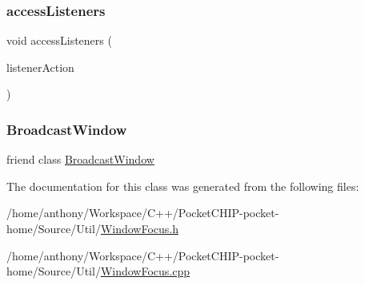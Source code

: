 \subsubsection{\texorpdfstring{access\+Listeners}{accessListeners}}
{\footnotesize\ttfamily void access\+Listeners (\begin{DoxyParamCaption}\item[{std\+::function$<$ void(Array$<$ \mbox{\hyperlink{classWindowFocus_1_1Listener}{Window\+Focus\+::\+Listener}} $\ast$$>$ \&) $>$}]{listener\+Action }\end{DoxyParamCaption})\hspace{0.3cm}{\ttfamily [friend]}}

\mbox{\label{classWindowFocus_1_1Listener_a279028e0d9a84a0657de4a70a6232340}} 
\subsubsection{\texorpdfstring{Broadcast\+Window}{BroadcastWindow}}
{\footnotesize\ttfamily friend class \mbox{\hyperlink{classWindowFocus_1_1BroadcastWindow}{Broadcast\+Window}}\hspace{0.3cm}{\ttfamily [friend]}}



The documentation for this class was generated from the following files\+:\begin{DoxyCompactItemize}
\item 
/home/anthony/\+Workspace/\+C++/\+Pocket\+C\+H\+I\+P-\/pocket-\/home/\+Source/\+Util/\mbox{\hyperlink{WindowFocus_8h}{Window\+Focus.\+h}}\item 
/home/anthony/\+Workspace/\+C++/\+Pocket\+C\+H\+I\+P-\/pocket-\/home/\+Source/\+Util/\mbox{\hyperlink{WindowFocus_8cpp}{Window\+Focus.\+cpp}}\end{DoxyCompactItemize}
